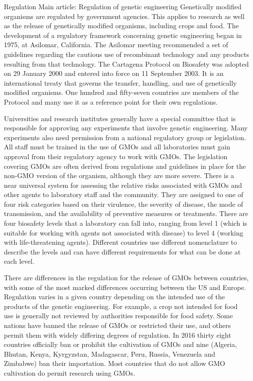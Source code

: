 Regulation
Main article: Regulation of genetic engineering
Genetically modified organisms are regulated by government agencies. This applies to research as well as the release of genetically modified organisms, including crops and food. The development of a regulatory framework concerning genetic engineering began in 1975, at Asilomar, California. The Asilomar meeting recommended a set of guidelines regarding the cautious use of recombinant technology and any products resulting from that technology. The Cartagena Protocol on Biosafety was adopted on 29 January 2000 and entered into force on 11 September 2003. It is an international treaty that governs the transfer, handling, and use of genetically modified organisms. One hundred and fifty-seven countries are members of the Protocol and many use it as a reference point for their own regulations.

Universities and research institutes generally have a special committee that is responsible for approving any experiments that involve genetic engineering. Many experiments also need permission from a national regulatory group or legislation. All staff must be trained in the use of GMOs and all laboratories must gain approval from their regulatory agency to work with GMOs. The legislation covering GMOs are often derived from regulations and guidelines in place for the non-GMO version of the organism, although they are more severe. There is a near universal system for assessing the relative risks associated with GMOs and other agents to laboratory staff and the community. They are assigned to one of four risk categories based on their virulence, the severity of disease, the mode of transmission, and the availability of preventive measures or treatments. There are four biosafety levels that a laboratory can fall into, ranging from level 1 (which is suitable for working with agents not associated with disease) to level 4 (working with life-threatening agents). Different countries use different nomenclature to describe the levels and can have different requirements for what can be done at each level.

There are differences in the regulation for the release of GMOs between countries, with some of the most marked differences occurring between the US and Europe. Regulation varies in a given country depending on the intended use of the products of the genetic engineering. For example, a crop not intended for food use is generally not reviewed by authorities responsible for food safety. Some nations have banned the release of GMOs or restricted their use, and others permit them with widely differing degrees of regulation. In 2016 thirty eight countries officially ban or prohibit the cultivation of GMOs and nine (Algeria, Bhutan, Kenya, Kyrgyzstan, Madagascar, Peru, Russia, Venezuela and Zimbabwe) ban their importation. Most countries that do not allow GMO cultivation do permit research using GMOs.

